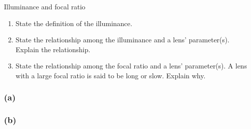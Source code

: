 \documentclass[main.tex]{subfiles}
\begin{document}
\begin{q}{6}
Illuminance and focal ratio
\begin{enumerate}[label=\text{(\alph*)}]
    \item State the definition of the illuminance.
    \item State the relationship among the illuminance and a lens' parameter(s). Explain the relationship.
    \item State the relationship among the focal ratio and a lens' parameter(s). A lens with a large focal ratio is said to be long or slow. Explain why.
\end{enumerate}
\end{q}

\begin{sol}
\subsubsection*{(a)}

\subsubsection*{(b)} 
\end{sol}
\end{document}

